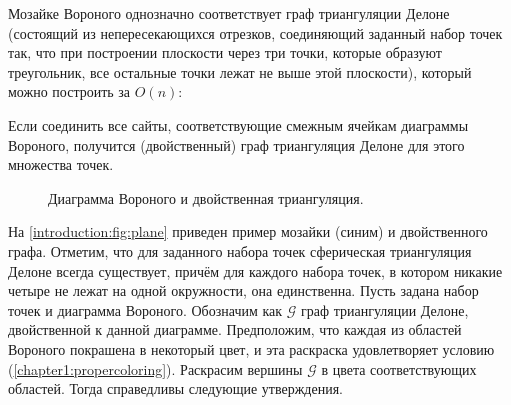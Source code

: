 Мозайке Вороного однозначно соответствует граф триангуляции Делоне (состоящий из непересекающихся отрезков, соединяющий заданный набор точек так, что при построении плоскости через три точки, которые образуют треугольник, все остальные точки лежат не выше этой плоскости), который можно построить за $O(n)$:

\begin{theorem1}
Если соединить все сайты, соответствующие смежным ячейкам диаграммы Вороного, получится (двойственный) граф триангуляция Делоне для этого множества точек.
\end{theorem1}

\begin{figure}[h]
\centering
\captionsetup{justification=centering}
\caption{Диаграмма Вороного и двойственная триангуляция.}
\label{chapter1:fig:triangexample}
\end{figure}

На \figurename{ \ref{introduction:fig:plane}} приведен пример мозайки (синим) и двойственного графа.
Отметим, что для заданного набора точек сферическая триангуляция Делоне всегда существует, причём для каждого набора точек, в котором никакие четыре не лежат на одной окружности, она единственна.
Пусть задана набор точек и диаграмма Вороного. Обозначим как $\mathcal{G}$ граф триангуляции Делоне, двойственной к данной диаграмме. Предположим, что каждая из областей Вороного покрашена в некоторый цвет, и эта раскраска удовлетворяет условию 
(\ref{chapter1:propercoloring}). Раскрасим вершины $\mathcal{G}$ в цвета соответствующих областей. Тогда справедливы следующие утверждения.

